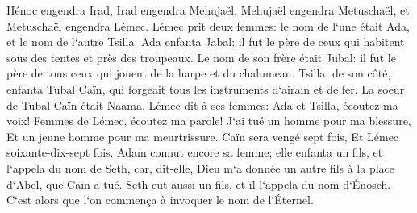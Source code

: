 \verse Hénoc engendra Irad, Irad engendra Mehujaël, Mehujaël engendra Metuschaël, et Metuschaël engendra Lémec. 
\verse Lémec prit deux femmes: le nom de l`une était Ada, et le nom de l`autre Tsilla. 
\verse Ada enfanta Jabal: il fut le père de ceux qui habitent sous des tentes et près des troupeaux. 
\verse Le nom de son frère était Jubal: il fut le père de tous ceux qui jouent de la harpe et du chalumeau. 
\verse Tsilla, de son côté, enfanta Tubal Caïn, qui forgeait tous les instruments d`airain et de fer. La soeur de Tubal Caïn était Naama. 
\verse Lémec dit à ses femmes: Ada et Tsilla, écoutez ma voix! Femmes de Lémec, écoutez ma parole! J`ai tué un homme pour ma blessure, Et un jeune homme pour ma meurtrissure. 
\verse Caïn sera vengé sept fois, Et Lémec soixante-dix-sept fois. 
\verse Adam connut encore sa femme; elle enfanta un fils, et l`appela du nom de Seth, car, dit-elle, Dieu m`a donnée un autre fils à la place d`Abel, que Caïn a tué. 
\verse Seth eut aussi un fils, et il l`appela du nom d`Énosch. C`est alors que l`on commença à invoquer le nom de l`Éternel. 

\chapter{}

